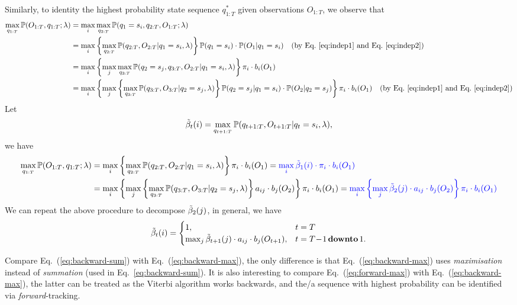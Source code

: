 Similarly, to identity the highest probability state sequence $q_{1:T}^*$ given observations $O_{1:T}$, 
we observe that 
\begin{align*}
\max_{q_{1:T}} \mathbb{P}(O_{1:T}, q_{1:T} ;\lambda) 
&= \max_{i} \max_{q_{2:T}} \mathbb{P}(q_1 = s_i, q_{2:T}, O_{1:T} ;\lambda) \\
&= \max_{i} \left\{ \max_{q_{2:T}} \mathbb{P}(q_{2:T}, O_{2:T} |q_1 = s_i, \lambda) \right\} \mathbb{P}(q_1 = s_i) \cdot \mathbb{P}(O_1 |q_1 = s_i) 
   ~~~ \text{(by Eq.~\ref{eq:indep1} and Eq.~\ref{eq:indep2})} \\
&= \max_{i} \left\{ \max_{j} \max_{q_{3:T}} \mathbb{P}(q_2 = s_j, q_{3:T}, O_{2:T} |q_1 = s_i, \lambda) \right\} \pi_i \cdot b_i(O_1) \\
&= \max_{i} \left\{ \max_{j} \left\{ \max_{q_{3:T}} \mathbb{P}(q_{3:T}, O_{3:T} |q_2 = s_j, \lambda) \right\} \mathbb{P}(q_2 = s_j |q_1 = s_i) \cdot \mathbb{P}(O_2 |q_2 = s_j) 
   \right\} \pi_i \cdot b_i(O_1) 
   ~~~ \text{(by Eq.~\ref{eq:indep1} and Eq.~\ref{eq:indep2})}
\end{align*}
Let 
\begin{equation}
\label{eq:betat}
\tilde{\beta}_t(i) = \max_{q_{t+1:T}} \mathbb{P}(q_{t+1:T}, O_{t+1:T} |q_t = s_i, \lambda),
\end{equation}
we have
\begin{align*}
\max_{q_{1:T}} \mathbb{P}(O_{1:T}, q_{1:T} ;\lambda) 
&= \max_{i} \left\{ \max_{q_{2:T}} \mathbb{P}(q_{2:T}, O_{2:T} |q_1 = s_i, \lambda) \right\} \pi_i \cdot b_i(O_1) 
 = {\color{blue}{\max_{i} \tilde{\beta}_1(i) \cdot \pi_i \cdot b_i(O_1)}} \\
&= \max_{i} \left\{ \max_{j} \left\{ \max_{q_{3:T}} \mathbb{P}(q_{3:T}, O_{3:T} |q_2 = s_j, \lambda) \right\} a_{ij} \cdot b_j(O_2) \right\} \pi_i \cdot b_i(O_1) 
 = {\color{blue}{\max_{i} \left\{ \max_{j} \tilde{\beta}_2(j) \cdot a_{ij} \cdot b_j(O_2) \right\} \pi_i \cdot b_i(O_1)}}  \nonumber
\end{align*}
We can repeat the above procedure to decompose $\tilde{\beta}_2(j)$, in general, we have
\begin{equation}
\label{eq:backward-max}
\tilde{\beta}_t(i) = \begin{cases}
              1, & t=T \\
              \max_{j} \tilde{\beta}_{t+1}(j) \cdot a_{ij} \cdot b_j(O_{t+1}), & t=T\!-\!1 \,\textbf{downto}\, 1.
             \end{cases}
\end{equation}

Compare Eq.~(\ref{eq:backward-sum}) with Eq.~(\ref{eq:backward-max}), 
the only difference is that Eq.~(\ref{eq:backward-max}) uses \emph{maximisation} instead of \emph{summation} (used in Eq.~\ref{eq:backward-sum}).
It is also interesting to compare Eq.~(\ref{eq:forward-max}) with Eq.~(\ref{eq:backward-max}), 
the latter can be treated as the Viterbi algorithm works backwards, 
and the/a sequence with highest probability can be identified via \emph{forward}-tracking.


